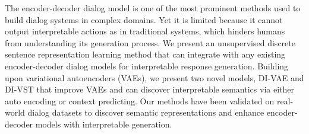 The encoder-decoder dialog model is one of the most prominent methods used to build dialog systems in complex domains. Yet it is limited because it cannot output interpretable actions as in traditional systems, which hinders humans from understanding its generation process. We present an unsupervised discrete sentence representation learning method that can integrate with any existing encoder-decoder dialog models for interpretable response generation. Building upon variational autoencoders (VAEs), we present two novel models, DI-VAE and DI-VST that improve VAEs and can discover interpretable semantics via either auto encoding or context predicting. Our methods have been validated on real-world dialog datasets to discover semantic representations and enhance encoder-decoder models with interpretable generation.
